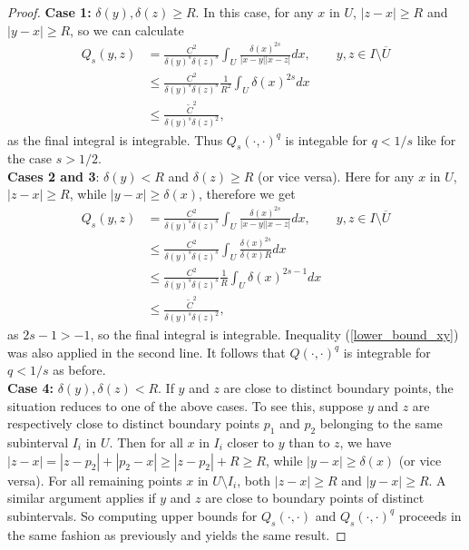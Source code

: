 \documentclass[preprint,12pt]{elsarticle}
\begin{document}
\begin{proof}
    \noindent \textbf{Case 1:} $\delta(y),\delta(z)\geq R$. In this case, for any $x$ in $U$, $|z-x|\geq R$ and $|y-x|\geq R$, so we can calculate
    \begin{align}\label{case1_Qbound_s<1/2}
    Q_s(y,z)&=\frac{C^2}{\delta(y)^s\delta(z)^s}\int_{U}\frac{\delta(x)^{2s}}{|x-y||x-z|}dx, \qquad y,z\in I\setminus\overline{U}\nonumber\\
    &\leq\frac{C^2}{\delta(y)^s\delta(z)^s}\frac{1}{R^2}\int_{U}\delta(x)^{2s}dx\nonumber\\
    &\leq \frac{\tilde{C}^2}{\delta(y)^s\delta(z)^2},
    \end{align}
    as the final integral is integrable. Thus $Q_s(\cdot,\cdot)^q$ is integable for $q<1/s$ like for the case $s>1/2$.\\
    
    \noindent\textbf{Cases 2 and 3}: $\delta(y)<R$ and $\delta(z)\geq R$ (or vice versa). Here for any $x$ in $U$, $|z-x|\geq R$, while $|y-x|\geq \delta(x)$, therefore we get
    \begin{align}\label{case2_Qbound_s<1/2}
        Q_s(y,z)&=\frac{C^2}{\delta(y)^s\delta(z)^s}\int_{U}\frac{\delta(x)^{2s}}{|x-y||x-z|}dx, \qquad y,z\in I\setminus\overline{U}\nonumber\\
        &\leq\frac{C^2}{\delta(y)^s\delta(z)^s}\int_{U}\frac{\delta(x)^{2s}}{\delta(x)R}dx\nonumber\nonumber\\
        &\leq\frac{C^2}{\delta(y)^s\delta(z)^s}\frac{1}{R}\int_{U}\delta(x)^{2s-1}dx\nonumber\\
        &\leq \frac{\tilde{C}^2}{\delta(y)^s\delta(z)^2},
    \end{align}
    as $2s-1>-1$, so the final integral is integrable. Inequality (\ref{lower_bound_xy}) was also applied in the second line. It follows that $Q(\cdot,\cdot)^q$ is integrable for $q<1/s$ as before.\\

    \noindent\textbf{Case 4:} $\delta(y),\delta(z)<R$. If $y$ and $z$ are close to distinct boundary points, the situation reduces to one of the above cases. To see this, suppose $y$ and $z$ are respectively close to distinct boundary points $p_1$ and $p_2$ belonging to the same subinterval $I_i$ in $U$. Then for all $x$ in $I_i$ closer to $y$ than to $z$, we have $|z-x|=|z-p_2|+|p_2-x|\geq|z-p_2|+R\geq R$, while $|y-x|\geq\delta(x)$ (or vice versa). For all remaining points $x$ in $U\setminus I_i$, both $|z-x|\geq R$ and $|y-x|\geq R$. A similar argument applies if $y$ and $z$ are close to boundary points of distinct subintervals. So computing upper bounds for $Q_s(\cdot,\cdot)$ and $Q_s(\cdot,\cdot)^q$ proceeds in the same fashion as previously and yields the same result.
    

\end{proof}
\end{document}
